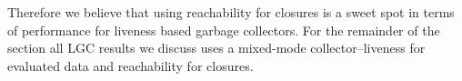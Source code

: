 \documentclass[9pt]{sigplanconf}
\newcommand{\comment}[1]{{\color{Myblue}{(#1)}}}
\begin{document}
Therefore we believe  that using reachability for closures  is a sweet
spot   in   terms   of   performance  for   liveness   based   garbage
collectors.  For the  remainder  of  the section  all  LGC results  we
discuss uses  a mixed-mode collector--liveness for  evaluated data and
reachability for closures.


\end{document}
